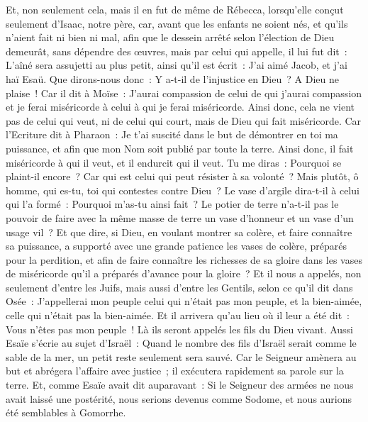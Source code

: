 \begin{multicols}{2}
Et, non seulement cela, mais il en fut de même de Rébecca, lorsqu'elle conçut seulement d'Isaac, notre père,
car, avant que les enfants ne soient nés, et qu'ils n'aient fait ni bien ni mal, afin que le dessein arrêté selon l'élection de Dieu demeurât, sans dépendre des œuvres, mais par celui qui appelle,
il lui fut dit~: L'aîné sera assujetti au plus petit, ainsi qu'il est écrit~:
J'ai aimé Jacob, et j'ai haï Esaü.
Que dirons-nous donc~: Y a-t-il de l'injustice en Dieu~? A Dieu ne plaise~!
Car il dit à Moïse~: J'aurai compassion de celui de qui j'aurai compassion et je ferai miséricorde à celui à qui je ferai miséricorde.
Ainsi donc, cela ne vient pas de celui qui veut, ni de celui qui court, mais de Dieu qui fait miséricorde.
Car l'Ecriture dit à Pharaon~: Je t'ai suscité dans le but de démontrer en toi ma puissance, et afin que mon Nom soit publié par toute la terre.
Ainsi donc, il fait miséricorde à qui il veut, et il endurcit qui il veut.
Tu me diras~: Pourquoi se plaint-il encore~? Car qui est celui qui peut résister à sa volonté~?
Mais plutôt, ô homme, qui es-tu, toi qui contestes contre Dieu~? Le vase d'argile dira-t-il à celui qui l'a formé~: Pourquoi m'as-tu ainsi fait~?
Le potier de terre n'a-t-il pas le pouvoir de faire avec la même masse de terre un vase d'honneur et un vase d'un usage vil~?
Et que dire, si Dieu, en voulant montrer sa colère, et faire connaître sa puissance, a supporté avec une grande patience les vases de colère, préparés pour la perdition,
et afin de faire connaître les richesses de sa gloire dans les vases de miséricorde qu'il a préparés d'avance pour la gloire~?
Et il nous a appelés, non seulement d'entre les Juifs, mais aussi d'entre les Gentils,
selon ce qu'il dit dans Osée~: J'appellerai mon peuple celui qui n'était pas mon peuple, et la bien-aimée, celle qui n'était pas la bien-aimée.
Et il arrivera qu'au lieu où il leur a été dit~: Vous n'êtes pas mon peuple~! Là ils seront appelés les fils du Dieu vivant.
Aussi Esaïe s'écrie au sujet d'Israël~: Quand le nombre des fils d'Israël serait comme le sable de la mer, un petit reste seulement sera sauvé.
Car le Seigneur amènera au but et abrégera l'affaire avec justice~; il exécutera rapidement sa parole sur la terre.
Et, comme Esaïe avait dit auparavant~: Si le Seigneur des armées ne nous avait laissé une postérité, nous serions devenus comme Sodome, et nous aurions été semblables à Gomorrhe.

\end{multicols}
